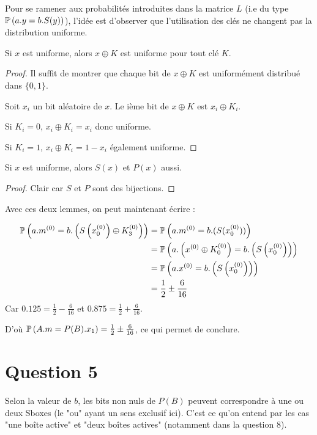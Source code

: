 Pour se ramener aux probabilités introduites dans la matrice $L$ (i.e du type $\mathbb{P}\left( a.y = b.S(y) \right)$), l'idée est d'observer que l'utilisation des clés ne changent pas la distribution uniforme.

\begin{lemma}
	Si $x$ est uniforme, alors $x \oplus K$ est uniforme pour tout clé $K$.
\end{lemma}

\begin{proof}
	Il suffit de montrer que chaque bit de $x \oplus K$ est uniformément distribué dans $\{0,1\}$.

	Soit $x_i$ un bit aléatoire de $x$. Le ième bit de $x \oplus K$ est $x_i \oplus K_i$.

	Si $K_i = 0$, $x_i \oplus K_i = x_i$ donc uniforme.

	Si $K_i = 1$, $x_i \oplus K_i = 1 - x_i$ également uniforme. 
\end{proof}

\begin{lemma}
	Si $x$ est uniforme, alors $S(x)$ et $P(x)$ aussi.
\end{lemma}
\begin{proof}
	Clair car $S$ et $P$ sont des bijections.
\end{proof}

Avec ces deux lemmes, on peut maintenant écrire :

\begin{align*}
\mathbb{P}\left( a.m^{(0)}= b.\left (S\left (x_0^{(0)}\right ) \oplus K_3^{(0)}\right ) \right) &= \mathbb{P}\left( a.m^{(0)} = b.(S(x_0^{(0)})) \right) \\
													&= \mathbb{P}\left( a.\left(x^{(0)} \oplus K_0^{(0)}\right ) =  b.\left (S\left (x_0^{(0)}\right )\right ) \right) \\
													&= \mathbb{P}\left( a.x^{(0)} = b.\left(S\left(x_0^{\left(0\right)}\right)\right) \right) \\
													&= \frac{1}{2} \pm \frac{6}{16}
\end{align*}
Car $0.125 = \frac{1}{2} - \frac{6}{16}$ et $0.875 = \frac{1}{2} + \frac{6}{16}$.

D'où $\mathbb{P}\left( A.m = P(B).x_1 \right) = \frac{1}{2} \pm \frac{6}{16}$, ce qui permet de conclure.

\section*{Question 5}

Selon la valeur de $b$, les bits non nuls de $P(B)$ peuvent correspondre à une ou deux Sboxes (le "ou" ayant un sens exclusif ici). C'est ce qu'on entend par les cas "une boîte active" et "deux boîtes actives" (notamment dans la question 8).

